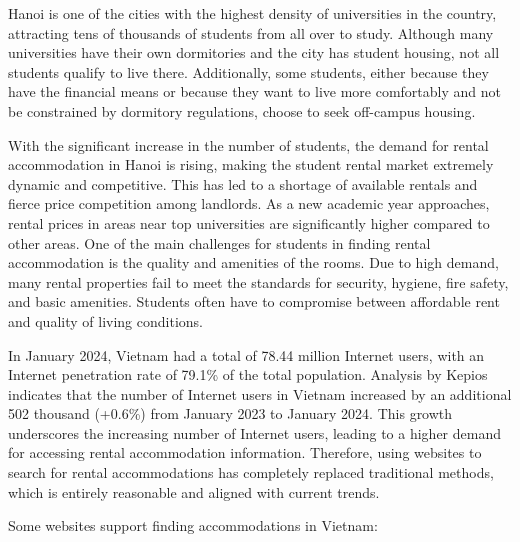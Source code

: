 \documentclass[../Main.tex]{subfiles}
\begin{document}
Hanoi is one of the cities with the highest density of universities in the country, attracting tens of thousands of students from all over to study.
Although many universities have their own dormitories and the city has student housing, not all students qualify to live there.
Additionally, some students, either because they have the financial means or because they want to live more comfortably and not be constrained by dormitory regulations, choose to seek off-campus housing.

With the significant increase in the number of students, the demand for rental accommodation in Hanoi is rising, making the student rental market extremely dynamic and competitive.
This has led to a shortage of available rentals and fierce price competition among landlords.
As a new academic year approaches, rental prices in areas near top universities are significantly higher compared to other areas.
One of the main challenges for students in finding rental accommodation is the quality and amenities of the rooms.
Due to high demand, many rental properties fail to meet the standards for security, hygiene, fire safety, and basic amenities.
Students often have to compromise between affordable rent and quality of living conditions.

In January 2024, Vietnam had a total of 78.44 million Internet users, with an Internet penetration rate of 79.1\% of the total population.
Analysis by Kepios indicates that the number of Internet users in Vietnam increased by an additional 502 thousand (+0.6\%) from January 2023 to January 2024.
This growth underscores the increasing number of Internet users, leading to a higher demand for accessing rental accommodation information.
Therefore, using websites to search for rental accommodations has completely replaced traditional methods, which is entirely reasonable and aligned with current trends.

Some websites support finding accommodations in Vietnam:
\end{document}
